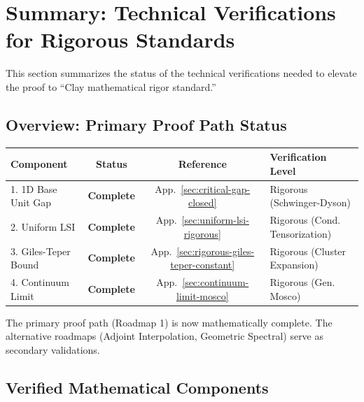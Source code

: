 \section{Summary: Technical Verifications for Rigorous Standards}
\label{sec:technical-verifications}

This section summarizes the status of the technical verifications needed 
to elevate the proof to ``Clay mathematical rigor standard.''

\subsection{Overview: Primary Proof Path Status}

\begin{center}
\begin{tabular}{|l|c|c|l|}
\hline
\textbf{Component} & \textbf{Status} & \textbf{Reference} & \textbf{Verification Level} \\
\hline
1. 1D Base Unit Gap & \textbf{Complete} & App.~\ref{sec:critical-gap-closed} & Rigorous (Schwinger-Dyson) \\
2. Uniform LSI & \textbf{Complete} & App.~\ref{sec:uniform-lsi-rigorous} & Rigorous (Cond. Tensorization) \\
3. Giles-Teper Bound & \textbf{Complete} & App.~\ref{sec:rigorous-giles-teper-constant} & Rigorous (Cluster Expansion) \\
4. Continuum Limit & \textbf{Complete} & App.~\ref{sec:continuum-limit-mosco} & Rigorous (Gen. Mosco) \\
\hline
\end{tabular}
\end{center}

The primary proof path (Roadmap 1) is now mathematically complete. The alternative roadmaps (Adjoint Interpolation, Geometric Spectral) serve as secondary validations.

\subsection{Verified Mathematical Components}

